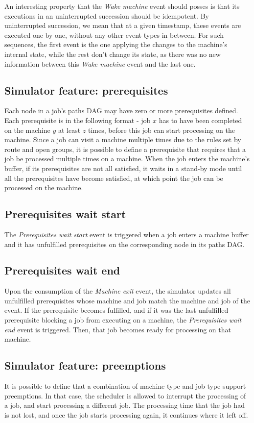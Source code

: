 An interesting property that the \textit{Wake machine} event should posses is that its executions in an uninterrupted succession should be idempotent. By uninterrupted succession, we mean that at a given timestamp, these events are executed one by one, without any other event types in between. For such sequences, the first event is the one applying the changes to the machine's internal state, while the rest don't change its state, as there was no new information between this \textit{Wake machine} event and the last one.

\subsection{Simulator feature: prerequisites}
Each node in a job's paths DAG may have zero or more prerequisites defined. Each prerequisite is in the following format - job $x$ has to have been completed on the machine $y$ at least $z$ times, before this job can start processing on the machine. Since a job can visit a machine multiple times due to the rules set by route and open groups, it is possible to define a prerequisite that requires that a job be processed multiple times on a machine. When the job enters the machine's buffer, if its prerequisites are not all satisfied, it waits in a stand-by mode until all the prerequisites have become satisfied, at which point the job can be processed on the machine.

\subsection{Prerequisites wait start}
The \textit{Prerequisites wait start} event is triggered when a job enters a machine buffer and it has unfulfilled prerequisites on the corresponding node in its paths DAG.

\subsection{Prerequisites wait end}
Upon the consumption of the \textit{Machine exit} event, the simulator updates all unfulfilled prerequisites whose machine and job match the machine and job of the event. If the prerequisite becomes fulfilled, and if it was the last unfulfilled prerequisite blocking a job from executing on a machine, the \textit{Prerequisites wait end} event is triggered. Then, that job becomes ready for processing on that machine.

\subsection{Simulator feature: preemptions}
It is possible to define that a combination of machine type and job type support preemptions. In that case, the scheduler is allowed to interrupt the processing of a job, and start processing a different job. The processing time that the job had is not lost, and once the job starts processing again, it continues where it left off.

